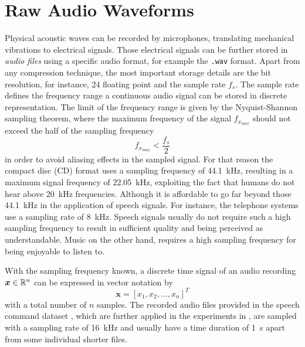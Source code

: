 
\section{Raw Audio Waveforms}\label{sec:signal_raw}
Physical acoustic waves can be recorded by microphones, translating mechanical vibrations to electrical signals. 
Those electrical signals can be further stored in \emph{audio files} using a specific audio format, for example the \texttt{.wav} format.
Apart from any compression technique, the most important storage details are the bit resolution, for instance, \SI{24}{\bit} floating point and the sample rate $f_s$.
The sample rate defines the frequency range a continuous audio signal can be stored in discrete representation.
The limit of the frequency range is given by the Nyquist-Shannon sampling theorem, where the maximum frequency of the signal $f_{x_{max}}$ should not exceed the half of the sampling frequency
\begin{equation}\label{eq:signal_raw_nyquist}
  f_{x_{max}} < \frac{f_s}{2}
\end{equation}
in order to avoid aliasing effects in the sampled signal.
For that reason the compact disc (CD) format uses a sampling frequency of \SI{44.1}{\kilo\hertz}, resulting in a maximum signal frequency of \SI{22.05}{\kilo\hertz}, exploiting the fact that humans do not hear above \SI{20}{\kilo\hertz} frequencies.
Although it is affordable to go far beyond those \SI{44.1}{\kilo\hertz} in the application of speech signals. 
For instance, the telephone systems use a sampling rate of \SI{8}{\kilo\hertz}.
Speech signals usually do not require such a high sampling frequency to result in sufficient quality and being perceived as understandable.
Music on the other hand, requires a high sampling frequency for being enjoyable to listen to.

With the sampling frequency known, a discrete time signal of an audio recording $\bm{x} \in \mathbb{R}^n$ can be expressed in vector notation by
\begin{equation}\label{eq:signal_raw_x}
  \bm{x} = [x_1, x_2, \dots, x_n]^T
\end{equation}
with a total number of $n$ samples.
The recorded audio files provided in the speech command dataset \cite{Warden2018}, which are further applied in the experiments in , are sampled with a sampling rate of \SI{16}{\kilo\hertz} and usually have a time duration of \SI{1}{\second} apart from some individual shorter files.


